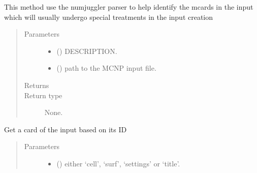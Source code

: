 \documentclass[letterpaper,10pt,english]{sphinxmanual}
\begin{document}
\begin{fulllineitems}
\begin{fulllineitems}
\label{\detokenize{api/inputgeneration:inputfile.InputFile.from_text}}
\sphinxAtStartPar
This method use the numjuggler parser to help identify the mcards in
the input which will usually undergo special treatments in the input
creation
\begin{quote}\begin{description}
\item[{Parameters}] \leavevmode\begin{itemize}
\item {} 
\sphinxAtStartPar
{} () \textendash{} DESCRIPTION.

\item {} 
\sphinxAtStartPar
{} () \textendash{} path to the MCNP input file.

\end{itemize}

\item[{Returns}] \leavevmode
\sphinxAtStartPar


\item[{Return type}] \leavevmode
\sphinxAtStartPar
None.

\end{description}\end{quote}

\end{fulllineitems}


\begin{fulllineitems}
\label{\detokenize{api/inputgeneration:inputfile.InputFile.get_card_byID}}
\sphinxAtStartPar
Get a card of the input based on its ID
\begin{quote}\begin{description}
\item[{Parameters}] \leavevmode\begin{itemize}
\item {} 
\sphinxAtStartPar
{} () \textendash{} either ‘cell’, ‘surf’, ‘settings’ or ‘title’.


\end{itemize}
\end{description}
\end{quote}
\end{fulllineitems}
\end{fulllineitems}
\end{document}
